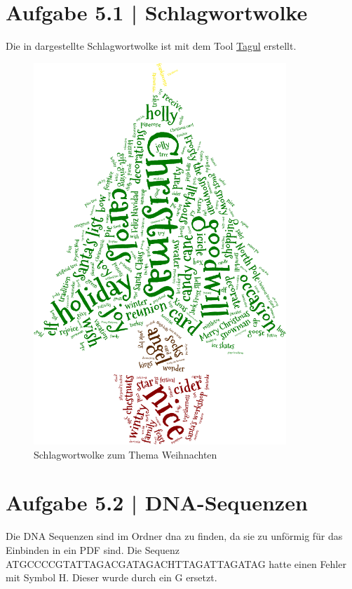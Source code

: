 \documentclass[a4paper,12pt,ngerman]{scrartcl}
\begin{document}
\pagestyle{fancy} %

\section{Aufgabe 5.1 | Schlagwortwolke}
Die in  dargestellte Schlagwortwolke ist mit dem Tool \href{https://tagul.com/}{Tagul} erstellt.

\begin{figure}[ht]
    \centering
    \includegraphics[width=0.85\textwidth]{includes/schlagwortwolke}
    \caption{Schlagwortwolke zum Thema Weihnachten}
    \label{fig:schlagwortwolke}
\end{figure}

\section{Aufgabe 5.2 | DNA-Sequenzen}
Die DNA Sequenzen sind im Ordner dna zu finden, da sie zu unförmig für das Einbinden in ein PDF sind. Die Sequenz ATGCCCCGTATTAGACGATAGACHTTAGATTAGATAG hatte einen Fehler mit Symbol H. Dieser wurde durch ein G ersetzt.
\end{document}
